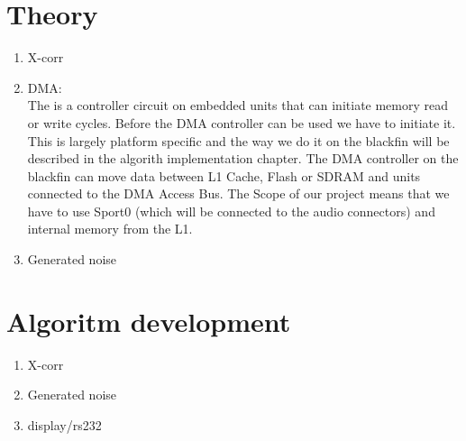 \chapter{Theory}
\begin{enumerate}
\item X-corr
\item DMA:\\
The is a controller circuit on embedded units that can initiate memory read or write cycles. Before the DMA controller can be used we have to initiate it. This is largely platform specific and the way we do it on the blackfin will be described in the algorith implementation chapter. The DMA controller on the blackfin can move data between L1 Cache, Flash or SDRAM and units connected to the DMA Access Bus. The Scope of our project means that we have to use Sport0 (which will be connected to the audio connectors) and internal memory from the L1. 
\item Generated noise
\end{enumerate}

\chapter{Algoritm development}
\begin{enumerate}
\item X-corr
\item Generated noise
\item display/rs232
\end{enumerate}

